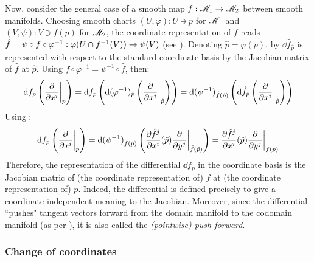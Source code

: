Now, consider the general case of a smooth map $ f : \mathscr{M}_1 \rightarrow \mathscr{M}_2 $ between smooth manifolds. Choosing smooth charts $ (U,\varphi) : U \ni p $ for $ \mathscr{M}_1 $ and $ (V,\psi) : V \ni f(p) $ for $ \mathscr{M}_2 $, the coordinate representation of $ f $ reads $ \hat{f} = \psi \circ f \circ \varphi^{-1} : \varphi(U \cap f^{-1}(V)) \rightarrow \psi(V) $ (see ). Denoting $ \hat{p} = \varphi(p) $, by  $ \dd \hat{f}_{\hat{p}} $ is represented with respect to the standard coordinate basis by the Jacobian matrix of $ \hat{f} $ at $ \hat{p} $. Using $ f \circ \varphi^{-1} = \psi^{-1} \circ \hat{f} $, then:
\begin{equation*}
  \mathrm{d} f_p \left( \frac{\partial}{\partial x^i} \bigg\vert_p \right) = \mathrm{d} f_p \left( \mathrm{d} (\varphi^{-1})_{\hat{p}} \left( \frac{\partial}{\partial x^i} \bigg\vert_{\hat{p}} \right) \right) = \mathrm{d} (\psi^{-1})_{\hat{f}(\hat{p})} \left( \mathrm{d} \hat{f}_{\hat{p}} \left( \frac{\partial}{\partial x^i} \bigg\vert_{\hat{p}} \right) \right)
\end{equation*}
Using :
\begin{equation}
  \mathrm{d} f_p \left( \frac{\partial}{\partial x^i} \bigg\vert_p \right) = \mathrm{d} (\psi^{-1})_{\hat{f}(\hat{p})} \left( \frac{\partial \hat{f}^j}{\partial x^i}(\hat{p}) \frac{\partial}{\partial y^j} \bigg\vert_{\hat{f}(\hat{p})} \right) = \frac{\partial \hat{f}^j}{\partial x^i}(\hat{p}) \frac{\partial}{\partial y^j}\bigg\vert_{f(p)}
\end{equation}
Therefore, the representation of the differential $ \dd f_p $ in the coordinate basis is the Jacobian matric of (the coordinate representation of) $ f $ at (the coordinate representation of) $ p $. Indeed, the differential is defined precisely to give a coordinate-independent meaning to the Jacobian. Moreover, since the differential ``pushes" tangent vectors forward from the domain manifold to the codomain manifold (as per ), it is also called the \emph{(pointwise) push-forward}.

\subsubsection{Change of coordinates}

